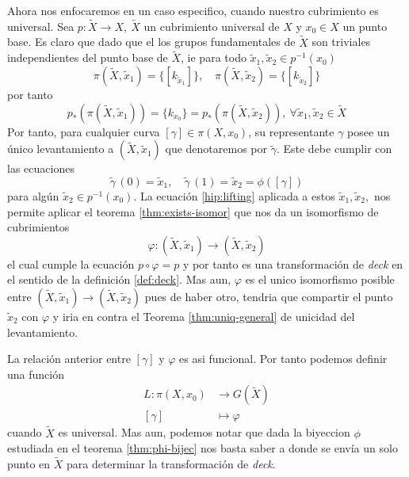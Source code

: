 Ahora nos enfocaremos en un caso especifico, cuando nuestro cubrimiento
es universal. Sea \(p : \tilde X \to X,\ \tilde X\) un
cubrimiento universal de \(X\) y \(x_0 \in X\) un punto base. Es
claro que dado que el los grupos fundamentales de \(\tilde X\) son
triviales independientes del punto base de \(\tilde X\), ie para todo
\(\tilde x_1, \tilde x_2 \in p^{-1} (x_0)\)
\begin{equation*}
  \pi \left( \tilde X , \tilde x_1 \right) = \{[k_{\tilde x_1}]\},\quad
  \pi \left( \tilde X , \tilde x_2 \right) = \{ [k_{\tilde x_2}]\}
\end{equation*}
por tanto
\begin{equation} \label{hip:lifting}
  p_* \left( \pi \left( \tilde X , \tilde x_1 \right) \right) =
  \{k_{x_0}\} = p_* \left( \pi \left( \tilde X , \tilde x_2 \right)
  \right),\ \forall \tilde x_1 , \tilde x_2 \in \tilde X
\end{equation}
Por tanto, para cualquier curva \([\gamma] \in \pi (X , x_0)\), su
representante \(\gamma\) posee un único levantamiento a \((\tilde X,
\tilde x_1)\) que denotaremos por \(\tilde \gamma\). Este debe cumplir
con las ecuaciones
\[ \tilde \gamma \, (0) = \tilde x_1, \quad \tilde \gamma \, (1) =
  \tilde x_2 = \phi ([\gamma]) \]
para algún \(\tilde x_2 \in p^{-1} (x_0)\). La ecuación
\eqref{hip:lifting} aplicada a estos \(\tilde x_1, \tilde x_2,\) nos
permite aplicar el teorema \ref{thm:exists-isomor} que nos da un
isomorfismo de cubrimientos
\[\varphi : (\tilde X , \tilde x_1) \to (\tilde X , \tilde x_2 ) \]
el cual cumple la ecuación \(p \circ \varphi = p\) y por tanto es una
transformación de \emph{deck} en el sentido de la definición
\ref{def:deck}. Mas aun, \(\varphi\) es el unico isomorfismo posible
entre \((\tilde X , \tilde x_1) \to (\tilde X , \tilde x_2 )\) pues de
haber otro, tendria que compartir el punto \(\tilde x_2\) con
\(\varphi\) y iria en contra el Teorema \ref{thm:uniq-general} de
unicidad del levantamiento.

La relación anterior entre \([\gamma]\) y \(\varphi\) es asi funcional.
Por tanto podemos definir una función
\begin{align}
  L : \pi (X, x_0) &\longrightarrow G (\tilde X) \label{def:L} \\
  [\gamma] &\longmapsto \varphi \nonumber
\end{align}
cuando \(\tilde X\) es universal. Mas aun, podemos notar que dada la
biyeccion \(\phi\) estudiada en el teorema \ref{thm:phi-bijec} nos basta
saber a donde se envía un solo punto en \(\tilde X\) para determinar la
transformación de \emph{deck}.


